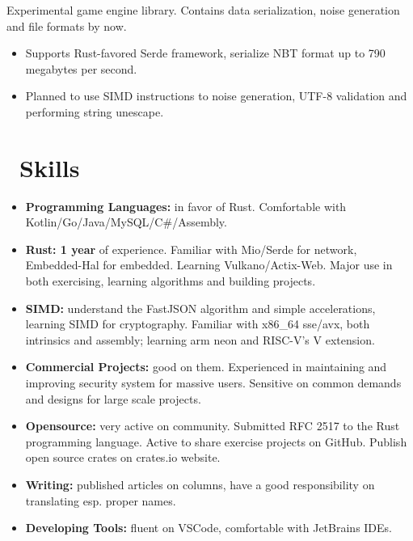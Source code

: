 \documentclass{resume}
\begin{document}
Experimental game engine library. Contains data serialization, noise generation and file formats by now.
\begin{itemize}
  \item Supports Rust-favored Serde framework, serialize NBT format up to 790 megabytes per second.
  \item Planned to use SIMD instructions to noise generation, UTF-8 validation and performing string unescape. 
\end{itemize}


\section{\faCogs\ Skills}
\begin{itemize}[parsep=0.5ex]
  \item \textbf {Programming Languages:} in favor of Rust. Comfortable with Kotlin/Go/Java/MySQL/C\#/Assembly.
  \item \textbf {Rust: 1 year} of experience. Familiar with Mio/Serde for network, Embedded-Hal for embedded. Learning Vulkano/Actix-Web. Major use in both exercising, learning algorithms and building projects.
  \item \textbf {SIMD:} understand the FastJSON algorithm and simple accelerations, learning SIMD for cryptography. Familiar with x86\_64 sse/avx, both intrinsics and assembly; learning arm neon and RISC-V's V extension.
  \item \textbf {Commercial Projects:} good on them. Experienced in maintaining and improving security system for massive users. Sensitive on common demands and designs for large scale projects.
  \item \textbf {Opensource:} very active on community. Submitted RFC 2517 to the Rust programming language. Active to share exercise projects on GitHub. Publish open source crates on crates.io website.
  \item \textbf {Writing:} published articles on columns, have a good responsibility on translating esp. proper names.
  \item \textbf {Developing Tools:} fluent on VSCode, comfortable with JetBrains IDEs.
\end{itemize}
\end{document}
